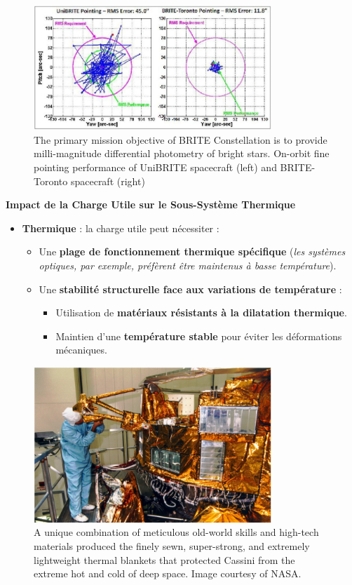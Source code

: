 \begin{figure}[H]
    	\centering
    	\includegraphics[width=0.8\textwidth]{figures/3.19.jpg}
    	\caption{The primary mission objective of BRITE Constellation is to provide milli-magnitude differential photometry of bright stars. On-orbit fine pointing performance of UniBRITE spacecraft (left) and BRITE-Toronto spacecraft (right)}
    	\label{fig:communication2}
\end{figure}
\textbf{Impact de la Charge Utile sur le Sous-Système Thermique}
\begin{itemize}
    \item \textbf{Thermique} : la charge utile peut nécessiter :
    \begin{itemize}
        \item Une \textbf{plage de fonctionnement thermique spécifique} (\textit{les systèmes optiques, par exemple, préfèrent être maintenus à basse température}).  
        \item Une \textbf{stabilité structurelle face aux variations de température} :
        \begin{itemize}
            \item Utilisation de \textbf{matériaux résistants à la dilatation thermique}.  
            \item Maintien d’une \textbf{température stable} pour éviter les déformations mécaniques.  
        \end{itemize}
    \end{itemize}
\end{itemize}
\begin{figure}[H]
    	\centering
    	\includegraphics[width=0.8\textwidth]{figures/3.20.jpg}
    	\caption{A unique combination of meticulous old-world skills and high-tech materials produced the finely sewn, super-strong, and extremely lightweight thermal blankets that protected Cassini from the extreme hot and cold of deep space. Image courtesy of NASA.}
    	\label{fig:communication2}
\end{figure}

